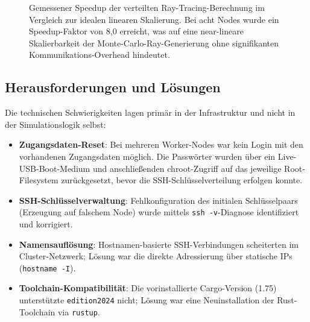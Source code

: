 \begin{figure}[htbp]
    \centering
    \caption{Gemessener Speedup der verteilten Ray-Tracing-Berechnung im
        Vergleich zur idealen linearen Skalierung. Bei acht Nodes wurde ein
        Speedup-Faktor von 8{,}0 erreicht, was auf eine near-lineare
        Skalierbarkeit der Monte-Carlo-Ray-Generierung ohne signifikanten
        Kommunikations-Overhead hindeutet.}
    \label{fig:speedup}
\end{figure}

\subsection{Herausforderungen und Lösungen}

Die technischen Schwierigkeiten lagen primär in der Infrastruktur und
nicht in der Simulationslogik selbst:

\begin{itemize}
    \item \textbf{Zugangsdaten-Reset}: Bei mehreren Worker-Nodes war kein
    Login mit den vorhandenen Zugangsdaten möglich. Die Passwörter
    wurden über ein Live-USB-Boot-Medium und anschließenden
    chroot-Zugriff auf das jeweilige Root-Filesystem zurückgesetzt,
    bevor die SSH-Schlüsselverteilung erfolgen konnte.
    \item \textbf{SSH-Schlüsselverwaltung}: Fehlkonfiguration des initialen
    Schlüsselpaars (Erzeugung auf falschem Node) wurde mittels
    \texttt{ssh -v}-Diagnose identifiziert und korrigiert.
    \item \textbf{Namensauflösung}: Hostnamen-basierte SSH-Verbindungen
    scheiterten im Cluster-Netzwerk; Lösung war die direkte Adressierung
    über statische IPs (\texttt{hostname -I}).
    \item \textbf{Toolchain-Kompatibilität}: Die vorinstallierte
    Cargo-Version (1.75) unterstützte \texttt{edition2024} nicht;
    Lösung war eine Neuinstallation der Rust-Toolchain via
    \texttt{rustup}.
\end{itemize}

